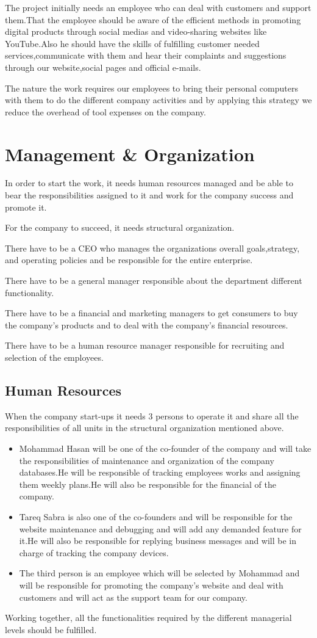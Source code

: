 \documentclass[fontsize=14pt,svgnames]{scrreprt}
\begin{document}
\par The project initially needs an employee who can deal with customers and support them.That the employee should be aware of the efficient methods in promoting digital products through social medias and video-sharing websites like YouTube.Also he should have the skills of fulfilling customer needed services,communicate with them and hear their complaints and suggestions through our website,social pages and official e-mails.
\par The nature the work requires our employees to bring their personal computers with them to do the different company activities and by applying this strategy we reduce the overhead of tool expenses on the company.
\chapter{Management \& Organization}
In order to start the work, it needs human resources managed and be able to bear the responsibilities assigned to it and work for the company success and promote it.
\par For the company to succeed, it needs structural organization.\par There have to be a CEO who manages the organizations overall goals,strategy, and operating policies and be responsible for the entire enterprise.\par There have to be a general manager responsible about the department different functionality.\par There have to be a financial and marketing managers to get consumers to buy the company's products and to deal with the company's financial resources.\par There have to be a human resource manager responsible for recruiting and selection of the employees.
\section{Human Resources}
When the company start-ups it needs 3 persons to operate it and share all the responsibilities of all units in the structural organization mentioned above.
\begin{itemize}
\item Mohammad Hasan will be one of the co-founder of the company and will take the responsibilities of maintenance and organization of the company databases.He will be responsible of tracking employees works and assigning them weekly plans.He will also be responsible for the financial of the company.
\item Tareq Sabra is also one of the co-founders and will be responsible for the website maintenance and debugging and will add any demanded feature for it.He will also be responsible for replying business messages and will be in charge of tracking the company devices.
\item The third person is an employee which will be selected by Mohammad and will be responsible for promoting the company's website and deal with customers and will act as the support team for our company.    
\end{itemize}
\par Working together, all the functionalities required by the different managerial levels should be fulfilled.
\end{document}
